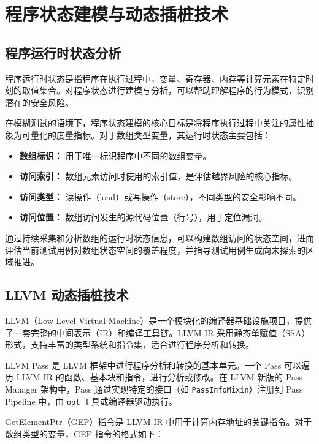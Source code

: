 \documentclass[bachelor]{njupthesis}
\begin{document}
\section{程序状态建模与动态插桩技术}

\subsection{程序运行时状态分析}

程序运行时状态是指程序在执行过程中，变量、寄存器、内存等计算元素在特定时刻的取值集合。对程序状态进行建模与分析，可以帮助理解程序的行为模式，识别潜在的安全风险。

在模糊测试的语境下，程序状态建模的核心目标是将程序执行过程中关注的属性抽象为可量化的度量指标。对于数组类型变量，其运行时状态主要包括：

\begin{itemize}
    \item \textbf{数组标识：} 用于唯一标识程序中不同的数组变量。
    \item \textbf{访问索引：} 数组元素访问时使用的索引值，是评估越界风险的核心指标。
    \item \textbf{访问类型：} 读操作（load）或写操作（store），不同类型的安全影响不同。
    \item \textbf{访问位置：} 数组访问发生的源代码位置（行号），用于定位漏洞。
\end{itemize}

通过持续采集和分析数组的运行时状态信息，可以构建数组访问的状态空间，进而评估当前测试用例对数组状态空间的覆盖程度，并指导测试用例生成向未探索的区域推进。

\subsection{LLVM 动态插桩技术}

LLVM（Low Level Virtual Machine）是一个模块化的编译器基础设施项目\cite{LLVM}，提供了一套完整的中间表示（IR）和编译工具链。LLVM IR 采用静态单赋值（SSA）形式，支持丰富的类型系统和指令集，适合进行程序分析和转换。

LLVM Pass 是 LLVM 框架中进行程序分析和转换的基本单元\cite{LLVMiris}。一个 Pass 可以遍历 LLVM IR 的函数、基本块和指令，进行分析或修改。在 LLVM 新版的 Pass Manager 架构中，Pass 通过实现特定的接口（如 \texttt{PassInfoMixin}）注册到 Pass Pipeline 中，由 \texttt{opt} 工具或编译器驱动执行。

GetElementPtr（GEP）指令是 LLVM IR 中用于计算内存地址的关键指令。对于数组类型的变量，GEP 指令的格式如下：
\end{document}
